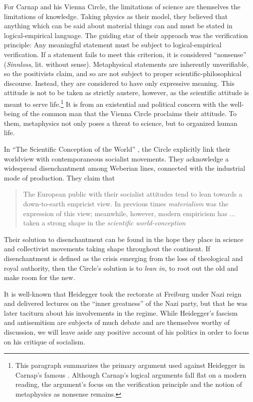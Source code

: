 \documentclass[leqno, 12pt]{turabian-researchpaper}
\begin{document}
	For Carnap and his Vienna Circle, the limitations of science are themselves the
	limitations of knowledge. Taking physics as their model, they believed that anything
	which can be said about material things can and must be stated in logical-empirical
	language. The guiding star of their approach was the verification principle: Any
	meaningful statement must be subject to logical-empirical verification. If a
	statement fails to meet this criterion, it is considered \enquote{nonsense} (\textit{Sinnloss},
	lit. without sense). Metaphysical statements are inherently unverifiable, so the
	positivists claim, and so are not subject to proper scientific-philosophical
	discourse. Instead, they are considered to have only expressive meaning. This attitude
	is not to be taken as strictly austere, however, as the scientific attitude is
	meant to serve life.\footnote{This paragraph summarizes the primary argument
	used against Heidegger in Carnap's famous \autocite{carnap1966}.
	Although Carnap's logical arguments fall flat on a modern reading, the argument's
	focus on the verification principle and the notion of metaphysics as nonsense remains.}
	It is from an existential and political concern with the well-being of the common
	man that the Vienna Circle proclaims their attitude. To them, metaphysics not only
	poses a threat to science, but to organized human life.

	In \enquote{The Scientific Conception of the World} \autocite{hahn1973}, the Circle
	explicitly link their worldview with contemporaneous socialist movements. They
	acknowledge a widespread disenchantment among Weberian lines, connected with the
	industrial mode of production. They claim that \blockquote[{\cite[p21f]{hahn1973}}]{The European public with their socialist attitudes tend to lean towards a down-to-earth empricist view. In previous times \emph{materialism} was the expression of this view; meanwhile, however, modern empiricism has ... taken a strong shape in the \emph{scientific world-conception}}.
	Their solution to disenchantment can be found in the hope they place in science
	and collectivist movements taking shape throughout the continent. If
	disenchantment is defined as the crisis emerging from the loss of theological
	and royal authority, then the Circle's solution is to \emph{lean in,} to root
	out the old and make room for the new.

	It is well-known that Heidegger took the rectorate at Freiburg under Nazi
	reign and delivered lectures on the \enquote{inner greatness} of the Nazi party,
	but that he was later taciturn about his involvements in the regime. While Heidegger's
	fascism and antisemitism are subjects of much debate and are themselves worthy
	of discussion, we will leave aside any positive account of his politics in
	order to focus on his critique of socialism.
\end{document}
